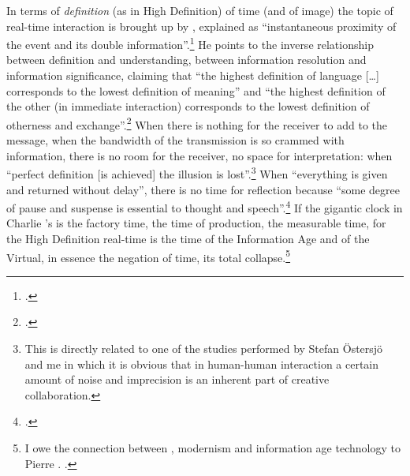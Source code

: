\label{sec:label:human-comp-inter:7}
\hypertarget{sec:human-comp-inter:7}{In terms of} \emph{definition} (as in High Definition) of time (and of image) the topic of real-time interaction is brought up by \citeauthor{baudrillard02}, explained as \hypertarget{sec:human-comp-inter:7-1}{``instantaneous proximity of the event and its double information''.}\footcite[30]{baudrillard96} He points to the inverse relationship between definition and understanding, between information resolution and information significance, claiming that ``the highest definition of language [\ldots] corresponds to the lowest definition of meaning'' and ``the highest definition of the other (in immediate interaction) corresponds to the lowest definition of otherness and exchange''.\footcite[30]{baudrillard96} When there is nothing for the receiver to add to the message, when the bandwidth of the transmission is so crammed with information, there is no room for the receiver, no space for interpretation: when ``perfect definition [is achieved] the illusion is lost''.\footnote{This is directly related to one of the studies performed by Stefan \"{O}stersj\"{o} and me in which it is obvious that in human-human interaction a certain amount of noise and imprecision is an inherent part of creative collaboration.} When ``everything is given and returned without delay'', there is no time for reflection because ``some degree of pause and suspense is essential to thought and speech''.\footcite[31]{baudrillard96} If the gigantic clock in Charlie \citeauthor{chaplin36}'s  is the factory time, the time of production, the measurable time, for \citeauthor{baudrillard02} the High Definition real-time is the time of the Information Age and of the Virtual, in essence the negation of time, its total collapse.\footnote{I owe the connection between , modernism and information age technology to Pierre \citeauthor{levy97}. \cite[See][180]{levy97}.}

